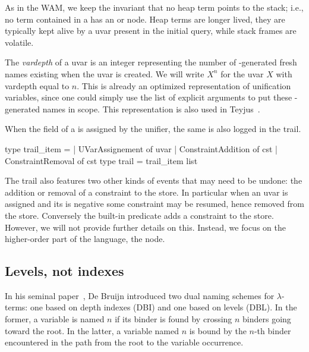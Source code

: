 \documentclass{these-ISSS}
\newenvironment{ocamlcode}
  {\VerbatimEnvironment\begin{ocamlbox}\begin{xocamlcode}}{\end{xocamlcode}
\end{ocamlbox}}
\begin{document}
As in the WAM, we keep the invariant that no heap term points to the stack;
i.e., no term contained in a  has an  or
 node. Heap terms are longer lived, they are typically kept alive by a
uvar present in the initial query, while stack frames are volatile.


The \emph{vardepth} of a uvar is an integer representing the number of
-generated fresh names existing when the uvar is created. We will
write $X^n$ for the uvar $X$ with vardepth equal to $n$. This is already an
optimized representation of unification variables, since one could simply use
the list of explicit arguments to put these -generated names in
scope. This representation is also used in
Teyjus~\cite{DBLP:journals/corr/abs-0911-5203}.


When the  field of a  is assigned by the unifier,
the same  is also logged in the trail.

\begin{ocamlcode}
type trail_item =
| UVarAssignement of uvar
| ConstraintAddition of cst
| ConstraintRemoval  of cst
type trail = trail_item list
\end{ocamlcode}

\noindent
The trail also features two other kinds of events that may need to be undone:
the addition or removal of a constraint to the store. In particular when
an uvar is assigned and its  is negative some constraint may
be resumed, hence removed from the store. Conversely the
 built-in predicate adds a constraint to the store.
~\\

However, we will not
provide further details on this. Instead, we focus on the higher-order part of
the language, the  node.

\subsection{Levels, not indexes}\label{sec:dbl}


In his seminal paper~\cite{DEBRUIJN1994375}, De Bruijn introduced two dual
naming schemes for $\lambda$-terms: one based on depth indexes (DBI) and one
based on levels (DBL). In the former, a variable is named $n$ if its binder is
found by crossing $n$ binders going toward the root. In the latter, a variable
named $n$ is bound by the $n$-th binder encountered in the path from the root
to the variable occurrence.
\end{document}
